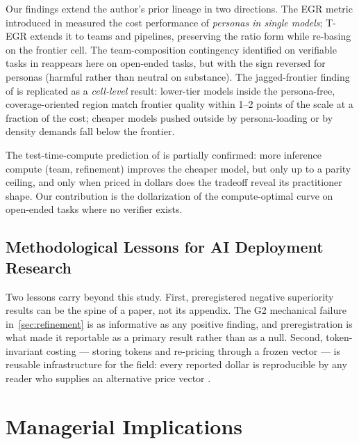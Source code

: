 \documentclass[12pt,a4paper]{article}
\begin{document}
Our findings extend the author's prior lineage in two directions. The EGR metric
introduced in \citet{Hariri2026b} measured the cost performance of \emph{personas
in single models}; T-EGR extends it to teams and pipelines, preserving the ratio
form while re-basing on the frontier cell. The team-composition contingency
identified on verifiable tasks in \citet{Hariri2025b} reappears here on open-ended
tasks, but with the sign reversed for personas (harmful rather than neutral on
substance). The jagged-frontier finding of \citet{DellAcquaEtAl2023} is replicated
as a \emph{cell-level} result: lower-tier models inside the persona-free,
coverage-oriented region match frontier quality within 1--2 points of the
scale at a fraction of the cost; cheaper
models pushed outside by persona-loading or by density demands fall below the
frontier.

The test-time-compute prediction of \citet{SnellEtAl2024} is partially confirmed:
more inference compute (team, refinement) improves the cheaper model, but only up
to a parity ceiling, and only when priced in dollars does the tradeoff reveal its
practitioner shape. Our contribution is the dollarization of the compute-optimal
curve on open-ended tasks where no verifier exists.

\subsection{Methodological Lessons for AI Deployment Research}

Two lessons carry beyond this study. First, preregistered negative superiority
results can be the spine of a paper, not its appendix. The G2 mechanical failure
in~\cref{sec:refinement} is as informative as any positive finding, and
preregistration is what made it reportable as a primary result rather than as a
null. Second, token-invariant costing --- storing tokens and re-pricing through a
frozen vector --- is reusable infrastructure for the field: every reported dollar
is reproducible by any reader who supplies an alternative price vector
\citep{Diewert1976, SandveEtAl2013}.


\section{Managerial Implications}\label{sec:managerial}
\end{document}
